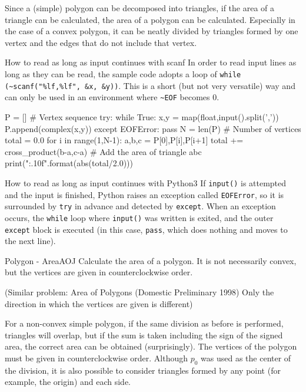 Since a (simple) polygon can be decomposed into triangles, if the area of a triangle can be calculated, the area of a polygon can be calculated. Especially in the case of a convex polygon, it can be neatly divided by triangles formed by one vertex and the edges that do not include that vertex.


\begin{tipsbox}{How to read as long as input continues with scanf}
In order to read input lines as long as they can be read, the sample code adopts a loop of \texttt{while (\~{}scanf("\%lf,\%lf", \&x, \&y))}. This is a short (but not very versatile) way and can only be used in an environment where \texttt{\~{}EOF} becomes 0.
\end{tipsbox}

\begin{pybox}
P = [] # Vertex sequence
try:
    while True:
        x,y = map(float,input().split(','))
        P.append(complex(x,y))
except EOFError:
    pass
N = len(P) # Number of vertices
total = 0.0
for i in range(1,N-1):
    a,b,c = P[0],P[i],P[i+1]
    total += cross_product(b-a,c-a) # Add the area of triangle abc
print("{:.10f}".format(abs(total/2.0)))
\end{pybox}

\begin{tipsbox}{How to read as long as input continues with Python3}
If \texttt{input()} is attempted and the input is finished, Python raises an exception called \texttt{EOFError}, so it is surrounded by \texttt{try} in advance and detected by \texttt{except}. When an exception occurs, the \texttt{while} loop where \texttt{input()} was written is exited, and the outer \texttt{except} block is executed (in this case, \texttt{pass}, which does nothing and moves to the next line).
\end{tipsbox}

\begin{psbox}{Polygon - Area}{AOJ}
Calculate the area of a polygon. It is not necessarily convex, but the vertices are given in counterclockwise order.


(Similar problem: Area of Polygons (Domestic Preliminary 1998)  Only the direction in which the vertices are given is different)
\end{psbox}
For a non-convex simple polygon, if the same division as before is performed, triangles will overlap, but if the sum is taken including the sign of the signed area, the correct area can be obtained (surprisingly). The vertices of the polygon must be given in counterclockwise order. Although $p_0$ was used as the center of the division, it is also possible to consider triangles formed by any point (for example, the origin) and each side.

